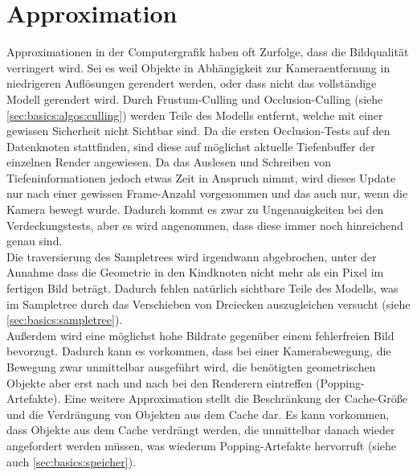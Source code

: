 \section{Approximation}
\label{sec:basics:approximation}
Approximationen in der Computergrafik haben oft  Zurfolge, dass die Bildqualität verringert wird. Sei es weil Objekte in Abhängigkeit zur Kameraentfernung in niedrigeren Auflösungen gerendert werden, oder dass nicht das vollständige Modell gerendert wird.
Durch Frustum-Culling und Occlusion-Culling (siehe \ref{sec:basics:algos:culling}) werden Teile des Modells entfernt, welche mit einer gewissen Sicherheit nicht Sichtbar sind. Da die ersten Occlusion-Tests auf den Datenknoten stattfinden, sind diese auf möglichst aktuelle Tiefenbuffer der einzelnen Render angewiesen. Da das Auslesen und Schreiben von Tiefeninformationen jedoch etwas Zeit in Anspruch nimmt, wird dieses Update nur nach einer gewissen Frame-Anzahl vorgenommen und das auch nur, wenn die Kamera bewegt wurde. Dadurch kommt es zwar zu Ungenauigkeiten bei den Verdeckungstests, aber es wird angenommen, dass diese immer noch hinreichend genau sind. \\
Die traversierung des Sampletrees wird irgendwann abgebrochen, unter der Annahme dass die Geometrie in den Kindknoten nicht mehr als ein Pixel im fertigen Bild beträgt. Dadurch fehlen natürlich sichtbare Teile des Modells, was im Sampletree durch das Verschieben von Dreiecken auszugleichen versucht (siehe \ref{sec:basics:sampletree}).\\
Außerdem wird eine möglichst hohe Bildrate gegenüber einem fehlerfreien Bild bevorzugt. Dadurch kann es vorkommen, dass bei einer Kamerabewegung, die Bewegung zwar unmittelbar ausgeführt wird, die benötigten geometrischen Objekte aber erst nach und nach bei den Renderern eintreffen (Popping-Artefakte). Eine weitere Approximation stellt die Beschränkung der Cache-Größe und die Verdrängung von Objekten aus dem Cache dar. Es kann vorkommen, dass Objekte aus dem Cache verdrängt werden, die unmittelbar danach wieder angefordert werden müssen, was wiederum Popping-Artefakte hervorruft (siehe auch \ref{sec:basics:speicher}). 
